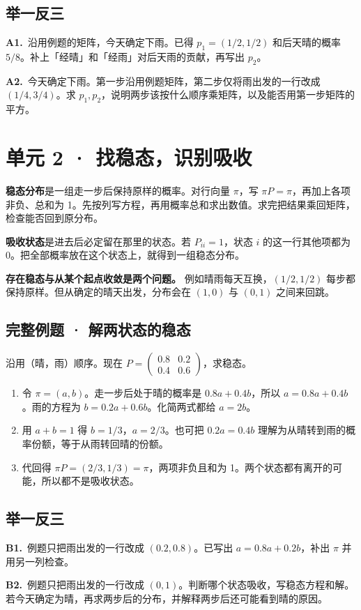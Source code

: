 \documentclass[UTF8,a4paper,11pt]{ctexart}
\newcommand{\CompactQuestion}[2]{\par\noindent\textbf{#1.}\ #2\par\vspace{.8em}}
\begin{document}
\subsection{举一反三}
\CompactQuestion{A1}{沿用例题的矩阵，今天确定下雨。已得 $p_1=(1/2,1/2)$ 和后天晴的概率 $5/8$。补上「经晴」和「经雨」对后天雨的贡献，再写出 $p_2$。}
\CompactQuestion{A2}{今天确定下雨。第一步沿用例题矩阵，第二步仅将雨出发的一行改成 $(1/4,3/4)$。求 $p_1,p_2$，说明两步该按什么顺序乘矩阵，以及能否用第一步矩阵的平方。}
\clearpage
\section{单元 2 · 找稳态，识别吸收}
\textbf{稳态分布}是一组走一步后保持原样的概率。对行向量 $\pi$，写 $\pi P=\pi$，再加上各项非负、总和为 1。先按列写方程，再用概率总和求出数值。求完把结果乘回矩阵，检查能否回到原分布。

\textbf{吸收状态}是进去后必定留在那里的状态。若 $P_{ii}=1$，状态 $i$ 的这一行其他项都为 0。把全部概率放在这个状态上，就得到一组稳态分布。

\textbf{存在稳态与从某个起点收敛是两个问题。} 例如晴雨每天互换，$(1/2,1/2)$ 每步都保持原样。但从确定的晴天出发，分布会在 $(1,0)$ 与 $(0,1)$ 之间来回跳。

\subsection{完整例题 · 解两状态的稳态}
沿用（晴，雨）顺序。现在 $P=\begin{pmatrix}0.8&0.2\\0.4&0.6\end{pmatrix}$，求稳态。

\begin{enumerate}
\item 令 $\pi=(a,b)$。走一步后处于晴的概率是 $0.8a+0.4b$，所以 $a=0.8a+0.4b$。雨的方程为 $b=0.2a+0.6b$。化简两式都给 $a=2b$。
\item 用 $a+b=1$ 得 $b=1/3$，$a=2/3$。也可把 $0.2a=0.4b$ 理解为从晴转到雨的概率份额，等于从雨转回晴的份额。
\item 代回得 $\pi P=(2/3,1/3)=\pi$，两项非负且和为 1。两个状态都有离开的可能，所以都不是吸收状态。
\end{enumerate}
\subsection{举一反三}
\CompactQuestion{B1}{例题只把雨出发的一行改成 $(0.2,0.8)$。已写出 $a=0.8a+0.2b$，补出 $\pi$ 并用另一列检查。}
\CompactQuestion{B2}{例题只把雨出发的一行改成 $(0,1)$。判断哪个状态吸收，写稳态方程和解。若今天确定为晴，再求两步后的分布，并解释两步后还可能看到晴的原因。}
\clearpage
\end{document}
